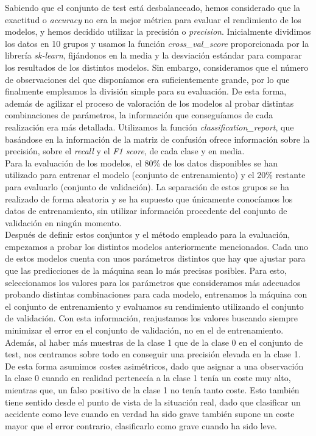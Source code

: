 \documentclass[journal,twoside]{JoPhA}
\begin{document}
Sabiendo que el conjunto de test está desbalanceado, hemos considerado que la exactitud o \textit{accuracy} no era la mejor métrica para evaluar el rendimiento de los modelos, y hemos decidido utilizar la precisión o \textit{precision}. Inicialmente dividimos los datos en 10 grupos y usamos la función \textit{cross\_val\_score} proporcionada por la librería \emph{sk-learn}\cite{validacion_cruzada}, fijándonos en la media y la desviación estándar para comparar los resultados de los distintos modelos. Sin embargo, consideramos que el número de observaciones del que disponíamos era suficientemente grande, por lo que finalmente empleamos la división simple para su evaluación. De esta forma, además de agilizar el proceso de valoración de los modelos al probar distintas combinaciones de parámetros, la información que conseguíamos de cada realización era más detallada. Utilizamos la función \textit{classification\_report}, que basándose en la información de la matriz de confusión ofrece información sobre la precisión, sobre el \textit{recall} y el \textit{F1 score}, de cada clase y en media. \\

Para la evaluación de los modelos, el 80\% de los datos disponibles se han utilizado para entrenar el modelo (conjunto de entrenamiento) y el 20\% restante para evaluarlo (conjunto de validación). La separación de estos grupos se ha realizado de forma aleatoria y se ha supuesto que únicamente conocíamos los datos de entrenamiento, sin utilizar información procedente del conjunto de validación en ningún momento. \\

Después de definir estos conjuntos y el método empleado para la evaluación, empezamos a probar los distintos modelos anteriormente mencionados. Cada uno de estos modelos cuenta con unos parámetros distintos que hay que ajustar para que las predicciones de la máquina sean lo más precisas posibles. Para esto, seleccionamos los valores para los parámetros que consideramos más adecuados probando distintas combinaciones para cada modelo, entrenamos la máquina con el conjunto de entrenamiento y evaluamos su rendimiento utilizando el conjunto de validación. Con esta información, reajustamos los valores buscando siempre minimizar el error en el conjunto de validación, no en el de entrenamiento. Además, al haber más muestras de la clase 1 que de la clase 0 en el conjunto de test, nos centramos sobre todo en conseguir una precisión elevada en la clase 1. De esta forma asumimos costes asimétricos, dado que asignar a una observación la clase 0 cuando en realidad pertenecía a la clase 1 tenía un coste muy alto, mientras que, un falso positivo de la clase 1 no tenía tanto coste. Esto también tiene sentido desde el punto de vista de la situación real, dado que clasificar un accidente como leve cuando en verdad ha sido grave también supone un coste mayor que el error contrario, clasificarlo como grave cuando ha sido leve.  \\
\end{document}
